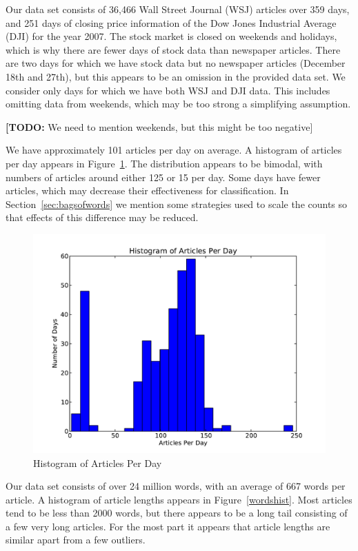\documentclass[10pt, twocolumn]{article}
\def\TODO#1{\noindent\textbf{[TODO:} #1]}
\begin{document}
Our data set consists of 36,466 Wall Street Journal (WSJ) articles over 359 days, and 251 days of closing price information of the Dow Jones Industrial Average (DJI) for the year 2007. The stock market is closed on weekends and holidays, which is why there are fewer days of stock data than newspaper articles. There are two days for which we have stock data but no newspaper articles (December 18th and 27th), but this appears to be an omission in the provided data set. We consider only days for which we have both WSJ and DJI data. This includes omitting data from weekends, which may be too strong a simplifying assumption.

\TODO{We need to mention weekends, but this might be too negative}

We have approximately 101 articles per day on average. A histogram of articles per day appears in Figure~\ref{articlehist}. The distribution appears to be bimodal, with numbers of articles around either 125 or 15 per day. Some days have fewer articles, which may decrease their effectiveness for classification. In Section~\ref{sec:bagsofwords} we mention some strategies used to scale the counts so that effects of this difference may be reduced.

\begin{figure}
\centering
\includegraphics[scale=0.3]{text/articleshist.pdf}
\caption{Histogram of Articles Per Day}

\label{articlehist}
\end{figure}

Our data set consists of over 24 million words, with an average of 667 words per article. A histogram of article lengths appears in Figure~\ref{wordshist}. Most articles tend to be less than 2000 words, but there appears to be a long tail consisting of a few very long articles. For the most part it appears that article lengths are similar apart from a few outliers.
\end{document}
